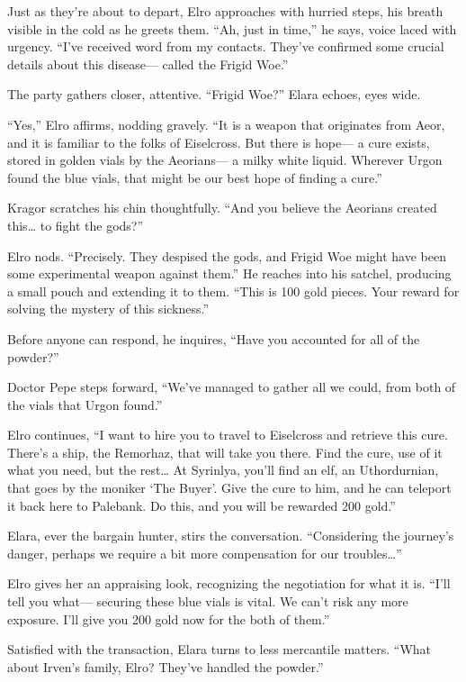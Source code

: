 \documentclass[
  letterpaper,12pt,twoside,twocolumn,openany,
  nodeprecatedcode,bg=full]{dndbook}
\begin{document}
Just as they're about to depart, Elro approaches with hurried steps, his
breath visible in the cold as he greets them. ``Ah, just in time,'' he
says, voice laced with urgency. ``I've received word from my contacts.
They've confirmed some crucial details about this disease--- called the
Frigid Woe.''

The party gathers closer, attentive. ``Frigid Woe?'' Elara echoes, eyes
wide.

``Yes,'' Elro affirms, nodding gravely. ``It is a weapon that originates
from Aeor, and it is familiar to the folks of Eiselcross. But there is
hope--- a cure exists, stored in golden vials by the Aeorians--- a milky
white liquid. Wherever Urgon found the blue vials, that might be our
best hope of finding a cure.''

Kragor scratches his chin thoughtfully. ``And you believe the Aeorians
created this\ldots{} to fight the gods?''

Elro nods. ``Precisely. They despised the gods, and Frigid Woe might
have been some experimental weapon against them.'' He reaches into his
satchel, producing a small pouch and extending it to them. ``This is 100
gold pieces. Your reward for solving the mystery of this sickness.''

Before anyone can respond, he inquires, ``Have you accounted for all of
the powder?''

Doctor Pepe steps forward, ``We've managed to gather all we could, from
both of the vials that Urgon found.''

Elro continues, ``I want to hire you to travel to Eiselcross and
retrieve this cure. There's a ship, the Remorhaz, that will take you
there. Find the cure, use of it what you need, but the rest\ldots{} At
Syrinlya, you'll find an elf, an Uthordurnian, that goes by the moniker
`The Buyer'. Give the cure to him, and he can teleport it back here to
Palebank. Do this, and you will be rewarded 200 gold.''

Elara, ever the bargain hunter, stirs the conversation. ``Considering
the journey's danger, perhaps we require a bit more compensation for our
troubles\ldots{}''

Elro gives her an appraising look, recognizing the negotiation for what
it is. ``I'll tell you what--- securing these blue vials is vital. We
can't risk any more exposure. I'll give you 200 gold now for the both of
them.''

Satisfied with the transaction, Elara turns to less mercantile matters.
``What about Irven's family, Elro? They've handled the powder.''
\end{document}
